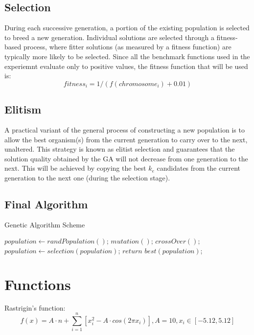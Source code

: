 \documentclass[a4paper]{article}
\begin{document}
	\subsection{Selection}
	
	During each successive generation, a portion of the existing population is selected to breed a new generation. Individual solutions are selected through a fitness-based process, where fitter solutions (as measured by a fitness function) are typically more likely to be selected.\cite{GA} Since all the benchmark functions used in the experiemnt evaluate only to positive values, the fitness function that will be used is:
	$$ fitness_{i} = 1 / (f(chromosome_i) + 0.01) $$
	
	\subsection{Elitism}
	
	A practical variant of the general process of constructing a new population is to allow the best organism(s) from the current generation to carry over to the next, unaltered. This strategy is known as elitist selection and guarantees that the solution quality obtained by the GA will not decrease from one generation to the next. \cite{GA} This will be achieved by copying the best $k_{e}$ candidates from the current generation to the next one (during the selection stage).
	
	\subsection{Final Algorithm}
	
	\begin{algorithm}
		\caption{Genetic Algorithm Scheme}
		\begin{algorithmic}[1]
			\State $population \gets randPopulation()$;
			\State $mutation()$;
			\State $crossOver()$;
			\State $population \gets selection(population)$;
			\EndFor
			\State $return$ $best(population)$;
		\end{algorithmic}
	\end{algorithm}
	
	\section{Functions}
	
	Rastrigin's function:
	$$ f(x) = A \cdot n + \sum_{i=1}^n \left[ x_i^2 - A \cdot cos(2 \pi x_i) \right],
	A = 10, x_i \in \left[ -5.12, 5.12 \right]$$
	
\end{document}
